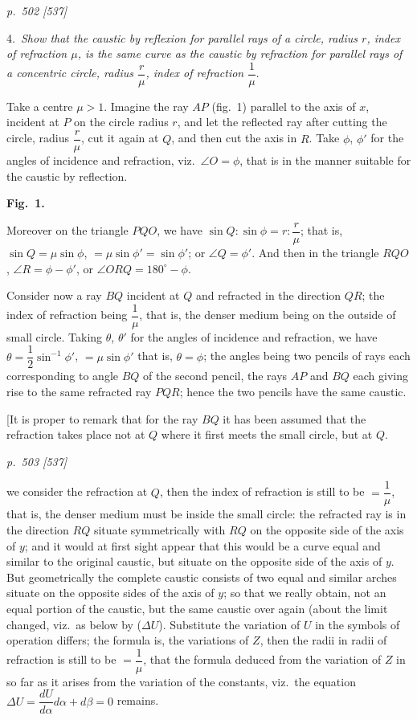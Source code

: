 \documentclass[11pt,a4paper]{book}
\begin{document}
\clearpage

\bigskip
\textit{p.~502 [537]}
\smallskip

\noindent
\textsc{4.}\, \textit{Show that the caustic by reflexion for parallel rays of a circle, radius $r$, index
of refraction $\mu$, is the same curve as the caustic by refraction for parallel rays of a
concentric circle, radius $\dfrac{r}{\mu}$, index of refraction $\dfrac{1}{\mu}$}.

Take a centre $\mu > 1$. Imagine the ray $AP$ (fig.\ 1) parallel to the axis of $x$,
incident at $P$ on the circle radius $r$, and let the reflected ray after cutting the circle,
radius $\dfrac{r}{\mu}$, cut it again at $Q$, and then cut the axis in $R$. Take $\phi$, $\phi'$ for the angles
of incidence and refraction, viz.\ $\angle O = \phi$, that is in the manner suitable for the
caustic by reflection.

\smallskip
\textbf{Fig.\ 1.}
\smallskip

Moreover on the triangle $PQO$, we have $\sin Q : \sin \phi = r : \dfrac{r}{\mu}$; that is, $\sin Q = \mu \sin \phi$,
$=\mu \sin \phi' = \sin \phi'$; or $\angle Q = \phi'$. And then in the triangle $RQO$, $\angle R = \phi - \phi'$, or
$\angle ORQ = 180^\circ - \phi$.

Consider now a ray $BQ$ incident at $Q$ and refracted in the direction $QR$; the
index of refraction being $\dfrac{1}{\mu}$, that is, the denser medium being on the outside of
small circle. Taking $\theta$, $\theta'$ for the angles of incidence and refraction, we have $\theta = \dfrac{1}{2}\sin^{-1}\phi'$,
$=\mu \sin\phi'$ that is, $\theta = \phi$; the angles being two pencils of rays each corresponding to angle $BQ$ of
the second pencil, the rays $AP$ and $BQ$ each giving rise to the same refracted ray
$PQR$; hence the two pencils have the same caustic.

[It is proper to remark that for the ray $BQ$ it has been assumed that the
refraction takes place not at $Q$ where it first meets the small circle, but at $Q$.

\clearpage

\bigskip
\textit{p.~503 [537]}
\smallskip

\noindent
we consider the refraction at $Q$, then the index of refraction is still to be $= \dfrac{1}{\mu}$, that
is, the denser medium must be inside the small circle: the refracted ray is in the
direction $RQ$ situate symmetrically with $RQ$ on the opposite side of the axis of $y$;
and it would at first sight appear that this would be a curve equal and similar to
the original caustic, but situate on the opposite side of the axis of $y$. But geometrically
the complete caustic consists of two equal and similar arches situate on the opposite
sides of the axis of $y$; so that we really obtain, not an equal portion of the caustic,
but the same caustic over again (about the limit changed, viz.\ as below by ($\Delta U$). Substitute the variation of $U$ in the symbols of operation differs; the formula
is, the variations of $Z$, then the radii in radii of refraction is still to be $= \dfrac{1}{\mu}$, that the formula deduced from the variation of $Z$ in so far as it arises from the
variation of the constants, viz.\ the equation $\Delta U = \dfrac{dU}{d\alpha}d\alpha + d\beta = 0$ remains.
\end{document}
